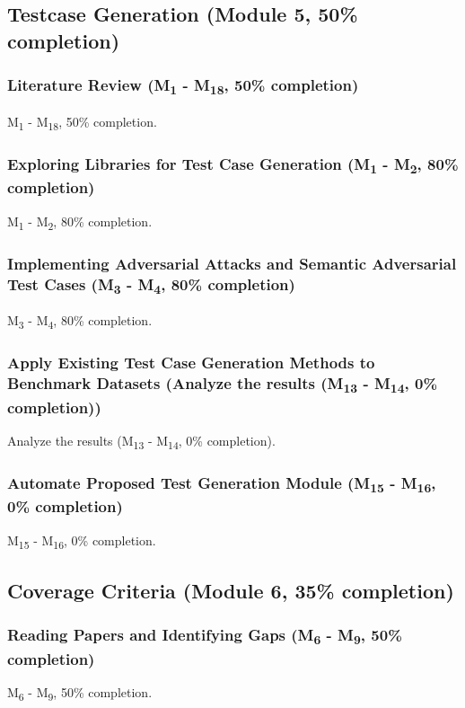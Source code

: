 \subsection{Testcase Generation (Module 5, 50\% completion)}
\subsubsection{Literature Review (M\textsubscript{1} - M\textsubscript{18}, 50\% completion)}
M\textsubscript{1} - M\textsubscript{18}, 50\% completion.

\subsubsection{Exploring Libraries for Test Case Generation (M\textsubscript{1} - M\textsubscript{2}, 80\% completion)}
M\textsubscript{1} - M\textsubscript{2}, 80\% completion.

\subsubsection{Implementing Adversarial Attacks and Semantic Adversarial Test Cases (M\textsubscript{3} - M\textsubscript{4}, 80\% completion)}
M\textsubscript{3} - M\textsubscript{4}, 80\% completion.

\subsubsection{Apply Existing Test Case Generation Methods to Benchmark Datasets (Analyze the results (M\textsubscript{13} - M\textsubscript{14}, 0\% completion))}
Analyze the results (M\textsubscript{13} - M\textsubscript{14}, 0\% completion).

\subsubsection{Automate Proposed Test Generation Module (M\textsubscript{15} - M\textsubscript{16}, 0\% completion)}
M\textsubscript{15} - M\textsubscript{16}, 0\% completion.

\subsection{Coverage Criteria (Module 6, 35\% completion)}
\subsubsection{Reading Papers and Identifying Gaps (M\textsubscript{6} - M\textsubscript{9}, 50\% completion)}
M\textsubscript{6} - M\textsubscript{9}, 50\% completion.

